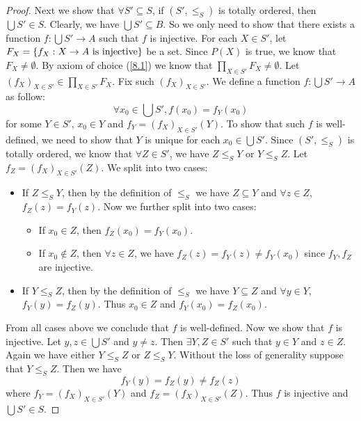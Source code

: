 \begin{proof}
  Next we show that \(\forall S' \subseteq S\), if \((S', \leq_S)\) is totally ordered, then \(\bigcup S' \in S\).
  Clearly, we have \(\bigcup S' \subseteq B\).
  So we only need to show that there exists a function \(f : \bigcup S' \to A\) such that \(f\) is injective.
  For each \(X \in S'\), let \(F_X = \left\lbrace f_X : X \to A \text{ is injective}\right\rbrace\) be a set.
  Since \(P(X)\) is true, we know that \(F_X \neq \emptyset\).
  By axiom of choice (\cref{8.1}) we know that \(\prod_{X \in S'} F_X \neq \emptyset\).
  Let \((f_X)_{X \in S'} \in \prod_{X \in S'} F_X\).
  Fix such \((f_X)_{X \in S'}\).
  We define a function \(f : \bigcup S' \to A\) as follow:
  \[
    \forall x_0 \in \bigcup S', f(x_0) = f_Y(x_0)
  \]
  for some \(Y \in S'\), \(x_0 \in Y\) and \(f_Y = (f_X)_{X \in S'}(Y)\).
  To show that such \(f\) is well-defined, we need to show that \(Y\) is unique for each \(x_0 \in \bigcup S'\).
  Since \((S', \leq_S)\) is totally ordered, we know that \(\forall Z \in S'\), we have \(Z \leq_S Y\) or \(Y \leq_S Z\).
  Let \(f_Z = (f_X)_{X \in S'}(Z)\).
  We split into two cases:
  \begin{itemize}
    \item If \(Z \leq_S Y\), then by the definition of \(\leq_S\) we have \(Z \subseteq Y\) and \(\forall z \in Z\), \(f_Z(z) = f_Y(z)\).
          Now we further split into two cases:
          \begin{itemize}
            \item If \(x_0 \in Z\), then \(f_Z(x_0) = f_Y(x_0)\).
            \item If \(x_0 \notin Z\), then \(\forall z \in Z\), we have \(f_Z(z) = f_Y(z) \neq f_Y(x_0)\) since \(f_Y, f_Z\) are injective.
          \end{itemize}
    \item If \(Y \leq_S Z\), then by the definition of \(\leq_S\) we have \(Y \subseteq Z\) and \(\forall y \in Y\), \(f_Y(y) = f_Z(y)\).
          Thus \(x_0 \in Z\) and \(f_Y(x_0) = f_Z(x_0)\).
  \end{itemize}
  From all cases above we conclude that \(f\) is well-defined.
  Now we show that \(f\) is injective.
  Let \(y, z \in \bigcup S'\) and \(y \neq z\).
  Then \(\exists Y, Z \in S'\) such that \(y \in Y\) and \(z \in Z\).
  Again we have either \(Y \leq_S Z\) or \(Z \leq_S Y\).
  Without the loss of generality suppose that \(Y \leq_S Z\).
  Then we have
  \[
    f_Y(y) = f_Z(y) \neq f_Z(z)
  \]
  where \(f_Y = (f_X)_{X \in S'}(Y)\) and \(f_Z = (f_X)_{X \in S'}(Z)\).
  Thus \(f\) is injective and \(\bigcup S' \in S\).


\end{proof}
